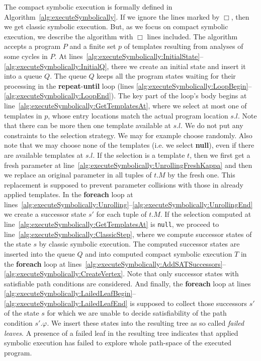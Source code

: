 \documentclass{sig-alternate}%
\begin{document}
The compact symbolic execution is formally defined in
Algorithm~\ref{alg:executeSymbolically}. If we ignore the lines marked
by $\Box$, then we get classic symbolic execution. But, as we focus on
compact symbolic execution, we describe the algorithm with $\Box$
lines included. The algorithm accepts a program $P$ and a finite set
$p$ of templates resulting from analyses of some cycles in $P$. At
lines~\ref{alg:executeSymbolically:InitialState}--\ref{alg:executeSymbolically:InitialQ},
there we create an initial state and insert it into a queue $Q$. The queue
$Q$ keeps all the program states waiting for their processing in the
\textbf{repeat}-\textbf{until} loop (lines
\ref{alg:executeSymbolically:LoopBegin}--\ref{alg:executeSymbolically:LoopEnd}). The
key part of the loop's body begins at
line~\ref{alg:executeSymbolically:GetTemplatesAt}, where we select at
most one of templates in $p$, whose entry locations match the actual
program location $s.l$. Note that there can be more then one template
available at $s.l$. We do not put any constraints to the selection
strategy. We may for example choose randomly. Also note that we may
choose none of the templates (i.e. we select \textbf{null}), even if
there are available templates at $s.l$.
If the selection is a template $t$, then we first get a fresh
parameter at line~\ref{alg:executeSymbolically:UnrollingFreshKappa}
and then we replace an original parameter in all tuples of $t.M$ by
the fresh one. This replacement is supposed to prevent parameter
collisions with those in already applied templates. In the
\textbf{foreach} loop at
lines~\ref{alg:executeSymbolically:Unrolling}--\ref{alg:executeSymbolically:UnrollingEnd}
we create a successor state $s'$ for each tuple of $t.M$.
If the selection computed at
line~\ref{alg:executeSymbolically:GetTemplatesAt} is \texttt{null}, we
proceed to line~\ref{alg:executeSymbolically:ClassicStep}, where we
compute successor states of the state $s$ by classic symbolic
execution. The computed successor states are inserted into the queue
$Q$ and into computed compact symbolic execution $T$ in the
\textbf{foreach} loop at
lines~\ref{alg:executeSymbolically:AddSATSuccessors}--\ref{alg:executeSymbolically:CreateVertex}.
Note that only successor states with satisfiable path conditions are
considered. And finally, the \textbf{foreach} loop at lines
\ref{alg:executeSymbolically:LailedLeafBegin}--\ref{alg:executeSymbolically:LailedLeafEnd}
is supposed to collect those successors $s'$ of the state $s$ for
which we are unable to decide satisfiability of the path condition
$s'.\varphi$. We insert these states into the resulting tree as so
called \emph{failed leaves}. A presence of a failed leaf in the
resulting tree indicates that applied symbolic execution has
failed to explore whole path-space of the executed program.
\end{document}
